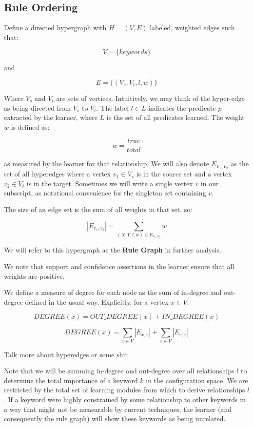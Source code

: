 \subsection{Rule Ordering}
\label{sec:ruleorder}

Define a directed hypergraph with $H = (V,E)$ labeled, weighted edges such that:

    $$V = \{ keywords \}$$

and 

    $$E = \{ (V_s, V_t, l, w) \}$$

Where $V_s$ and $V_t$ are sets of vertices. Intuitively, we may think of the
hyper-edge as being directed from $V_s$ to $V_t$. The label $l \in L$ indicates
the predicate $p$ extracted by the learner, where $L$ is the set of all
predicates learned. The weight $w$ is defined as:

    $$w = \frac{true}{total}$$

as measured by the learner for that relationship. We will also denote
$E_{V_1, V_2}$ as
the set of all hyperedges where a vertex $v_1 \in V_s$ is in the 
source set and a vertex $v_2 \in V_t$ is in the target. Sometimes we
will write a single vertex $v$ in our subscript, as notational convenience
for the singleton set containing $v$.

The size of an edge set is the sum of all weights in that set, so:

    $$|E_{v_1, v_2}| = \sum_{(X, Y, l, w) \in E_{v_1, v_2}} w$$

We will refer to this hypergraph as the {\bf Rule Graph}
in further analysis.

We note that support and confidence assertions in the learner ensure
that all weights are positive.

We define a measure of degree for each node as the sum of in-degree
and out-degree defined in the usual way. Explicitly, for a vertex $x \in V$:

    $$DEGREE(x) = OUT\_DEGREE(x) + IN\_DEGREE(x)$$

    $$DEGREE(x) = \sum_{v \in V} |E_{x, v}| + \sum_{v \in V} |E_{v, x}|$$

Talk more about hyperedges or some shit
\iffalse

Note that we will be summing in-degree and out-degree over all
relationships $l$ to determine the total importance of
a keyword $k$ in the configuration space. We are restricted
by the total set of learning modules from which to derive
relationships $l$. If a keyword were highly constrained by some
relationship to other keywords in a way that might not be
measurable by current techniques, the learner (and
consequently the rule graph) will show these keywords as being
unrelated.

